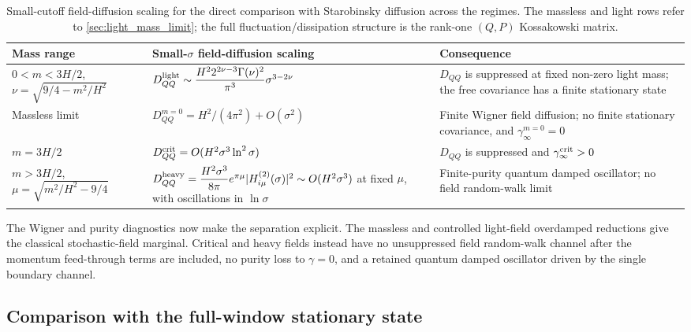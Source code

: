 \documentclass{article}
\numberwithin{equation}{section}
\begin{document}
	\begin{table}[t]
		\centering \small
		\begin{tabularx}{\textwidth}{>{\raggedright\arraybackslash}p{}>{\raggedright\arraybackslash}p{}>{\raggedright\arraybackslash}X}
			\hline Mass range & Small-\(\sigma\) field-diffusion scaling & Consequence \\ \hline \(0<m<3H/2\), \(\nu=\sqrt{9/4-m^2/H^2}\) & \(D_{QQ}^{\rm light}\sim\dfrac{H^2 2^{2\nu-3}\Gamma(\nu)^2}{\pi^3}\sigma^{3-2\nu}\) & \(D_{QQ}\) is suppressed at fixed non-zero light mass; the free covariance has a finite stationary state \\ \hline Massless limit & \(D_{QQ}^{m=0}=H^2/(4\pi^2)+O(\sigma^2)\) & Finite Wigner field diffusion; no finite stationary covariance, and \(\gamma_\infty^{m=0}=0\) \\ \hline \(m=3H/2\) & \(D_{QQ}^{\rm crit}=O(H^2\sigma^3\ln^2\sigma)\) & \(D_{QQ}\) is suppressed and \(\gamma_\infty^{\rm crit}>0\) \\ \hline \(m>3H/2\), \(\mu=\sqrt{m^2/H^2-9/4}\) & \(D_{QQ}^{\rm heavy}=\dfrac{H^2\sigma^3}{8\pi}e^{\pi\mu}|H_{i\mu}^{(2)}(\sigma)|^2\sim O(H^2\sigma^3)\) at fixed \(\mu\), with oscillations in \(\ln\sigma\) & Finite-purity quantum damped oscillator; no field random-walk limit \\ \hline
		\end{tabularx}
		\caption{Small-cutoff field-diffusion scaling for the direct comparison with Starobinsky diffusion across the regimes. The massless and light rows refer to \cref{sec:light_mass_limit}; the full fluctuation/dissipation structure is the rank-one \((Q,P)\) Kossakowski matrix.}
		\label{tab:diffusionScaling}
	\end{table}

	The Wigner and purity diagnostics now make the separation explicit. The massless and controlled light-field overdamped reductions give the classical stochastic-field marginal. Critical and heavy fields instead have no unsuppressed field random-walk channel after the momentum feed-through terms are included, no purity loss to \(\gamma=0\), and a retained quantum damped oscillator driven by the single boundary channel.


\subsection{Comparison with the full-window stationary state}
\label{sec:gradientComparison}
\end{document}
